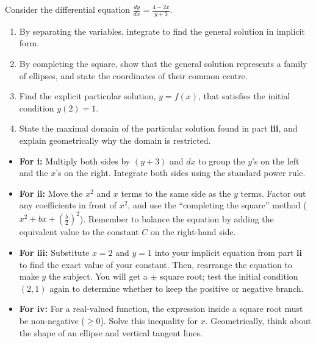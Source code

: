\begin{problem}
Consider the differential equation $\frac{dy}{dx} = \frac{4 - 2x}{y + 3}$.

\begin{enumerate}
    \item[\textbf{i}] By separating the variables, integrate to find the general solution in implicit form.
    \item[\textbf{ii}] By completing the square, show that the general solution represents a family of ellipses, and state the coordinates of their common centre.
    \item[\textbf{iii}] Find the explicit particular solution, $y = f(x)$, that satisfies the initial condition $y(2) = 1$.
    \item[\textbf{iv}] State the maximal domain of the particular solution found in part \textbf{iii}, and explain geometrically why the domain is restricted.
\end{enumerate}
\end{problem}

\begin{hint}
\begin{itemize}
    \item \textbf{For i:} Multiply both sides by $(y + 3)$ and $dx$ to group the $y$'s on the left and the $x$'s on the right. Integrate both sides using the standard power rule.
    \item \textbf{For ii:} Move the $x^2$ and $x$ terms to the same side as the $y$ terms. Factor out any coefficients in front of $x^2$, and use the ``completing the square'' method ($x^2 + bx + (\frac{b}{2})^2$). Remember to balance the equation by adding the equivalent value to the constant $C$ on the right-hand side.
    \item \textbf{For iii:} Substitute $x = 2$ and $y = 1$ into your implicit equation from part \textbf{ii} to find the exact value of your constant. Then, rearrange the equation to make $y$ the subject. You will get a $\pm$ square root; test the initial condition $(2,1)$ again to determine whether to keep the positive or negative branch.
    \item \textbf{For iv:} For a real-valued function, the expression inside a square root must be non-negative ($\ge 0$). Solve this inequality for $x$. Geometrically, think about the shape of an ellipse and vertical tangent lines.
\end{itemize}
\end{hint}

